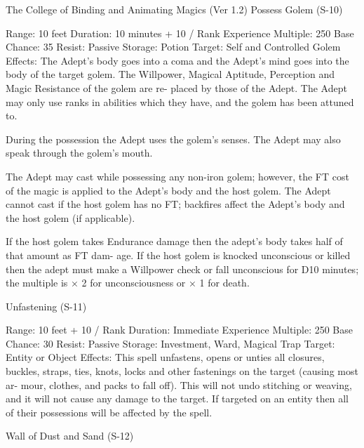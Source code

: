 \begin{Chapter}{The College of Binding and Animating Magics (Ver 1.2)}
Possess Golem (S-10) 

Range: 10 feet 
Duration: 10 minutes + 10 / Rank 
Experience Multiple: 250 
Base Chance: 35%
Resist: Passive 
Storage: Potion 
Target: Self and Controlled Golem 
Effects:  The  Adept’s  body  goes  into  a  coma  and 
the  Adept’s  mind  goes  into  the  body  of  the  target 
golem.  The  Willpower,  Magical  Aptitude,  Perception  and  Magic  Resistance  of  the  golem  are  re-
placed by those of the Adept. The Adept may only 
use  ranks  in  abilities  which  they  have,  and  the 
golem has been attuned to. 

During  the  possession  the  Adept  uses  the  golem’s 
senses.  The  Adept  may  also  speak  through  the 
golem’s mouth. 

The Adept may cast while possessing any non-iron 
golem;  however,  the  FT  cost  of  the  magic  is  applied to the Adept’s body and the host golem. The 
Adept  cannot  cast  if  the  host  golem  has  no  FT; 
backfires  affect  the  Adept’s  body  and  the  host 
golem (if applicable). 

If the host golem takes Endurance damage then the 
adept’s body takes half of that amount as FT dam-
age.  If  the  host  golem  is  knocked  unconscious  or 
killed then the adept must make a Willpower check 
or fall unconscious for D10 minutes; the multiple is 
× 2 for unconsciousness or × 1 for death. 

Unfastening (S-11) 

Range: 10 feet + 10 / Rank 
Duration: Immediate 
Experience Multiple: 250 
Base Chance: 30%
Resist: Passive 
Storage: Investment, Ward, Magical Trap 
Target: Entity or Object 
Effects:  This  spell  unfastens,  opens  or  unties  all 
closures,  buckles,  straps,  ties,  knots,  locks  and 
other  fastenings  on  the  target  (causing  most  ar-
mour, clothes, and packs to fall off). This  will not 
undo stitching or weaving, and it will not cause any 
damage  to  the  target.  If  targeted  on  an  entity  then 
all of their possessions will be affected by the spell. 

Wall of Dust and Sand (S-12) 


\end{Chapter}
